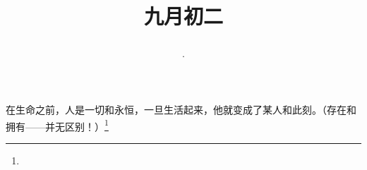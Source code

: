 \title{\date[d=4,m=10,y=2024][year:cn-y,年,month:cn,day:cn,日,·,weekday]·九月初二 }
在生命之前，人是一切和永恒，一旦生活起来，他就变成了某人和此刻。（存在和拥有——并无区别！）\footnote{ }

